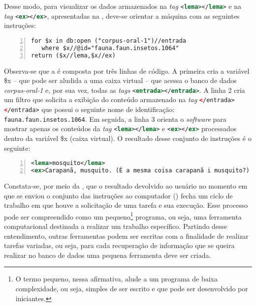 \documentclass[portuguese]{textolivre}
\begin{document}
Desse modo, para visualizar os dados armazenados na \emph{tag} \lstinline[language=XML]!<lema></lema>! e na \emph{tag} \lstinline[language=XML]!<ex></ex>!, apresentadas na , deve-se orientar a máquina com as seguintes instruções:

\begin{lstlisting}[language=XQuery, label=tab02, caption={Instruções para recuperação de dados de uma entrada específica.}, source={Elaboração do autor.}, numbers=left]
for $x in db:open ("corpus-oral-1")//entrada
   where $x//@id="fauna.faun.insetos.1064"  
return ($x//lema,$x//ex)
\end{lstlisting} %


Observa-se que a  é composta por três linhas de código. A primeira cria a variável \$x – que pode ser aludida a uma caixa virtual – que acessa o banco de dados \textit{corpus-oral-1} e, por sua vez, todas as \emph{tags} \lstinline[language=XML]!<entrada></entrada>!. A linha 2 cria um filtro que solicita a exibição do conteúdo armazenado na \emph{tag} \lstinline[language=XML]!</entrada></entrada>! que possui o seguinte nome de identificação: \lstinline[language=XML]!fauna.faun.insetos.1064!. Em seguida, a linha 3 orienta o \emph{software} para mostrar apenas os conteúdos da \emph{tag} \lstinline[language=XML]!<lema></lema>! e \lstinline[language=XML]!<ex></ex>! processados dentro da variável \$x (caixa virtual). O resultado desse conjunto de instruções é o seguinte:

\begin{lstlisting}[language=XML, label=tab03, caption={Resultados das instruções escritas na \Cref{tab02}}, source={Elaboração do autor.}, numbers=left]
<lema>mosquito</lema>
<ex>Carapanã, musquito. (É a mesma coisa carapanã i musquito?) É a mesma coisa. (É o mesmo bichinho?) É o mesmo bichinho.</ex>
\end{lstlisting} %

Constata-se, por meio da , que o resultado devolvido ao usuário no momento em que se enviou o conjunto das instruções ao computador () fecha um ciclo de trabalho em que houve a solicitação de uma tarefa e sua execução. Esse processo pode ser compreendido como um pequeno\footnote{O termo pequeno, nessa afirmativa, alude a um programa de baixa complexidade, ou seja, simples de ser escrito e que pode ser desenvolvido por iniciantes.} programa, ou seja, uma ferramenta computacional destinada a realizar um trabalho específico. Partindo desse entendimento, outras ferramentas podem ser escritas com a finalidade de realizar tarefas variadas, ou seja, para cada recuperação de informação que se queira realizar no banco de dados uma pequena ferramenta deve ser criada. 
\end{document}
